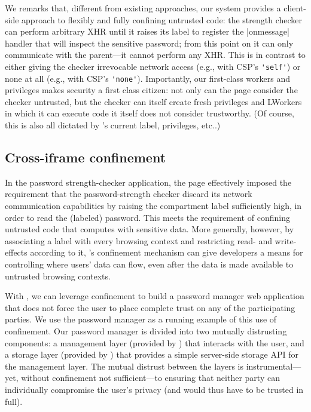 We remarks that, different from existing approaches, our system
provides a client-side approach to flexibly and fully confining
untrusted code:
%
the strength checker can perform arbitrary XHR until it raises its
label to register the \js|onmessage| handler that will inspect the
sensitive password; from this point on it can only communicate with
the parent---it cannot perform any XHR.
%
This is in contrast to either giving the checker irrevocable network
access (e.g., with CSP's \verb|'self'|) or none at all (e.g., with
CSP's \verb|'none'|).
%
Importantly, our first-class workers and privileges makes security a
first class citizen: not only can the page consider the checker
untrusted, but the checker can itself create fresh privileges and 
LWorkers in which it can execute code it itself does not consider
trustworthy.
%
(Of course, this is also all dictated by \sys{}'s current label,
privileges, etc..)


\subsection{Cross-iframe confinement}
\label{sec:system:iframe}

In the password strength-checker application, the 
page effectively imposed the requirement that the password-strength
checker discard its network communication capabilities by raising the
compartment label sufficiently high, in order to read the (labeled)
password.
%
This meets the requirement of confining untrusted code that computes
with sensitive data.
%
More generally, however, by associating a label with every browsing
context and restricting read- and write-effects according to it,
\sys{}'s confinement mechanism can give developers a means for
controlling where users' data can flow, even after the data is made
available to untrusted browsing contexts.

%
With \sys{}, we can leverage confinement to build a password manager
web application that does not force the user to place complete trust on 
any of the participating parties. We use the password manager as a
running example of this use of confinement.
%
Our password manager is divided into two mutually distrusting
components: a management layer (provided by )
that interacts with the user, 
and a storage layer (provided by ) that provides a
simple
server-side storage API for the
management layer.
%
The mutual distrust between the layers is instrumental---yet, without
confinement not sufficient---to ensuring that neither party can
individually compromise the user's privacy (and would thus have to be
trusted in full).
%

